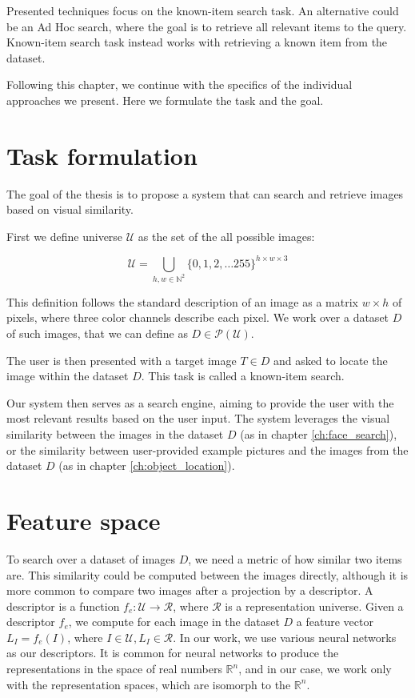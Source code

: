 Presented techniques focus on the known-item search task. An alternative could be an Ad Hoc search, where the goal is to retrieve all relevant items to the query. Known-item search task instead works with retrieving a known item from the dataset.

Following this chapter, we continue with the specifics of the individual approaches we present. Here we formulate the task and the goal.






\section{Task formulation}
\label{s:task_formulation_preliminaries}

The goal of the thesis is to propose a system that can search and retrieve images based on visual similarity.  

First we define universe $\mathcal{U}$ as the set of the all possible images:

$$
    \mathcal{U} = \bigcup_{h,w \in \mathbb{N}^2} \{0, 1, 2, \ldots 255 \}^{h \times w \times 3}
$$

This definition follows the standard description of an image as a matrix $w \times h$ of pixels, where three color channels describe each pixel. We work over a dataset $D$ of such images, that we can define as $D \in \mathcal{P(U)}$.

The user is then presented with a target image $T \in D$ and asked to locate the image within the dataset $D$. This task is called a known-item search. 

Our system then serves as a search engine, aiming to provide the user with the most relevant results based on the user input. The system leverages the visual similarity between the images in the dataset $D$ (as in chapter \ref{ch:face_search}), or the similarity between user-provided example pictures and the images from the dataset $D$ (as in chapter \ref{ch:object_location}).

\section{Feature space}

To search over a dataset of images $D$, we need a metric of how similar two items are. This similarity could be computed between the images directly, although it is more common to compare two images after a projection by a descriptor. A descriptor is a function $f_e: \mathcal{U} \rightarrow \mathcal{R}$, where $\mathcal{R}$ is a representation universe. Given a descriptor $f_e$, we compute for each image in the dataset $D$ a feature vector $L_I = f_e(I)$, where $I \in \mathcal{U}, L_I \in \mathcal{R}$. In our work, we use various neural networks as our descriptors. It is common for neural networks to produce the representations in the space of real numbers $\mathbb{R}^n$, and in our case, we work only with the representation spaces, which are isomorph to the $\mathbb{R}^n$.

